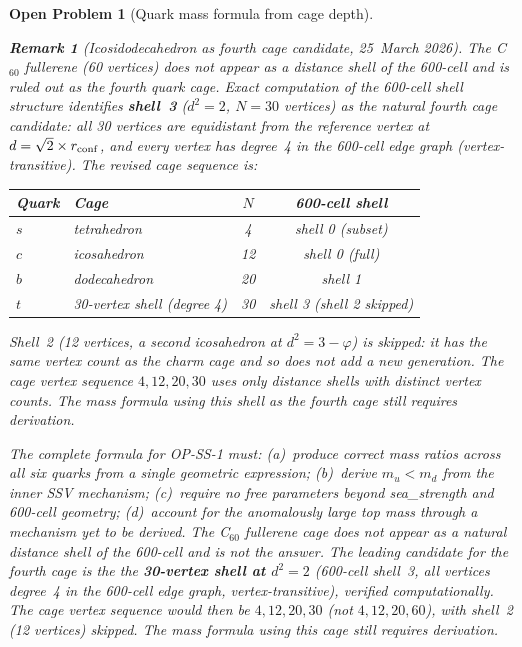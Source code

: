 \documentclass[11pt,letterpaper]{article}
\newtheorem{remark}[theorem]{Remark}
\newtheorem{openprob}[theorem]{Open Problem}
\newcommand{\phig}{\varphi}
\begin{document}
\begin{openprob}[Quark mass formula from cage depth]
\begin{remark}[Icosidodecahedron as fourth cage candidate, 25~March 2026]
The C$_{60}$ fullerene (60 vertices) does not appear as a distance
shell of the 600-cell and is ruled out as the fourth quark cage.
Exact computation of the 600-cell shell structure identifies
\textbf{shell~3} ($d^2 = 2$, $N = 30$ vertices) as the natural
fourth cage candidate: all 30 vertices are equidistant from the
reference vertex at $d = \sqrt{2}\times r_{\rm conf}$, and every
vertex has degree~4 in the 600-cell edge graph (vertex-transitive).
The revised cage sequence is:
\begin{center}
\renewcommand{\arraystretch}{1.2}
\begin{tabular}{llcc}
\toprule
Quark & Cage & $N$ & 600-cell shell \\
\midrule
$s$ & tetrahedron & 4 & shell 0 (subset) \\
$c$ & icosahedron & 12 & shell 0 (full) \\
$b$ & dodecahedron & 20 & shell 1 \\
$t$ & 30-vertex shell (degree 4) & 30 & shell 3 (shell 2 skipped) \\
\bottomrule
\end{tabular}
\end{center}
Shell~2 (12 vertices, a second icosahedron at $d^2 = 3-\phig$)
is skipped: it has the same vertex count as the charm cage and
so does not add a new generation.  The cage vertex sequence
$4, 12, 20, 30$ uses only distance shells with \emph{distinct}
vertex counts.  The mass formula using this shell as
the fourth cage still requires derivation.
\end{remark}

The complete formula for OP-SS-1 must: (a)~produce correct mass
ratios across all six quarks from a single geometric expression;
(b)~derive $m_u < m_d$ from the inner SSV mechanism; (c)~require
no free parameters beyond sea\_strength and 600-cell geometry;
(d)~account for the anomalously large top mass through a mechanism
yet to be derived.  The C$_{60}$ fullerene cage does not appear
as a natural distance shell of the 600-cell and is not the answer.
The leading candidate for the fourth cage is the
the \textbf{30-vertex shell at $d^2 = 2$} (600-cell shell~3,
all vertices degree~4 in the 600-cell edge graph,
vertex-transitive), verified computationally.  The cage vertex sequence would
then be $4, 12, 20, 30$ (not $4, 12, 20, 60$), with shell~2
(12 vertices) skipped.  The mass formula using this cage
still requires derivation.
\end{openprob}
\end{document}
